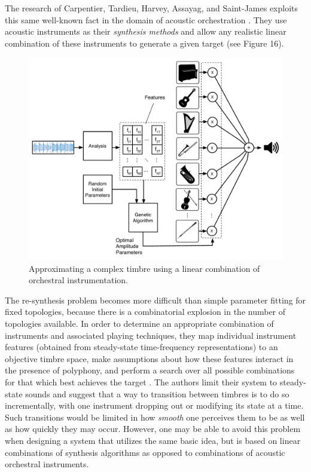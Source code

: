 \documentclass[12pt]{report} 	%
\numberwithin{figure}{chapter}
\numberwithin{table}{chapter}
\numberwithin{equation}{chapter}
\begin{document}
\begin{flushleft}
The research of Carpentier, Tardieu, Harvey, Assayag, and Saint-James exploits this same well-known fact in the domain of acoustic orchestration \cite{Carpentier:2010fh}. They use acoustic instruments as their \textit{synthesis methods} and allow any realistic linear combination of these instruments to generate a given target (see Figure 16). 
\begin{figure}[h!]
\begin{center}
\includegraphics[scale=0.55]{OrchestralMetaSynthesis}
\caption[Searching for linear combinations of orchestral instruments]{Approximating a complex timbre using a linear combination of orchestral instrumentation.}
\end{center}
\vspace{6pt}
\end{figure}
The re-synthesis problem becomes more difficult than simple parameter fitting for fixed topologies, because there is a combinatorial explosion in the number of topologies available. In order to determine an appropriate combination of instruments and associated playing techniques, they map individual instrument features (obtained from steady-state time-frequency representations) to an objective timbre space, make assumptions about how these features interact in the presence of polyphony, and perform a search over all possible combinations for that which best achieves the target \cite[p. 2]{Carpentier:2010fh}. The authors limit their system to steady-state sounds and suggest that a way to transition between timbres is to do so incrementally, with one instrument dropping out or modifying its state at a time. Such transitions would be limited in how \textit{smooth} one perceives them to be as well as how quickly they may occur. However, one may be able to avoid this problem when designing a system that utilizes the same basic idea, but is based on linear combinations of synthesis algorithms as opposed to combinations of acoustic orchestral instruments.


\end{flushleft}
\end{document}
